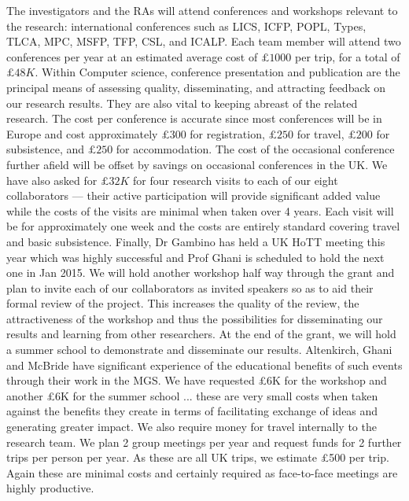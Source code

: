 \documentclass[a4paper,11pt]{article}
\begin{document}
 The investigators and the RAs will
attend conferences and workshops relevant to the research:
international conferences such as LICS, ICFP, POPL, Types, TLCA, MPC,
MSFP, TFP, CSL, and ICALP. Each team member will attend two
conferences per year at an estimated average cost of $\pounds 1000$
per trip, for a total of $\pounds 48K$. Within Computer science,
conference presentation and publication are the principal means of
assessing quality, disseminating, and attracting feedback
on our research results. They are also vital to keeping abreast of
the related research. The cost per conference
is accurate since most conferences will be in Europe and cost
approximately $\pounds 300$ for registration, $\pounds 250$ for
travel, $\pounds 200$ for subsistence, and $\pounds 250$ for
accommodation. The cost of the occasional conference further afield
will be offset by savings on occasional conferences in the UK. We have also asked for $\pounds 32K$ for four
research visits to each of our eight collaborators --- their active
participation will provide significant added value while the costs of
the visits are minimal when taken over 4 years. Each visit will be for
approximately one week and the costs are entirely standard covering
travel and basic subsistence. Finally, Dr Gambino has held a UK HoTT
meeting this year which was highly successful and Prof Ghani is
scheduled to hold the next one in Jan 2015. We will hold another
workshop half way through the grant and plan to invite each of our
collaborators as invited speakers so as to aid their formal review of
the project. This increases the quality of the review, the
attractiveness of the workshop and thus the possibilities for
disseminating our results and learning from other researchers. At the
end of the grant, we will hold a summer school to demonstrate and
disseminate our results. Altenkirch, Ghani and McBride have
significant experience of the educational benefits of such 
events through their work in the MGS. We have requested \pounds 6K for
the workshop and another \pounds 6K for the summer school ... these
are very small costs when taken against the benefits they create in
terms of facilitating exchange of ideas and generating greater
impact. We also require money for travel internally to the research
team. We plan 2 group meetings per year and request funds for 2
further trips per person per year. As these are all UK trips, we
estimate \pounds 500 per trip. Again these are minimal costs and
certainly required as face-to-face meetings are highly productive.


%
\end{document}
